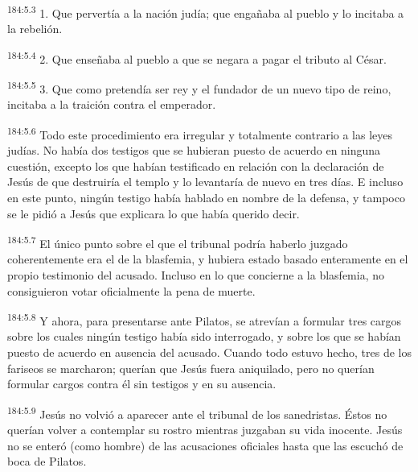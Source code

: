 \par 
\textsuperscript{184:5.3} 1. Que pervertía a la nación judía; que engañaba al pueblo y lo incitaba a la rebelión.

\par 
\textsuperscript{184:5.4} 2. Que enseñaba al pueblo a que se negara a pagar el tributo al César.

\par 
\textsuperscript{184:5.5} 3. Que como pretendía ser rey y el fundador de un nuevo tipo de reino, incitaba a la traición contra el emperador.

\par 
\textsuperscript{184:5.6} Todo este procedimiento era irregular y totalmente contrario a las leyes judías. No había dos testigos que se hubieran puesto de acuerdo en ninguna cuestión, excepto los que habían testificado en relación con la declaración de Jesús de que destruiría el templo y lo levantaría de nuevo en tres días. E incluso en este punto, ningún testigo había hablado en nombre de la defensa, y tampoco se le pidió a Jesús que explicara lo que había querido decir.

\par 
\textsuperscript{184:5.7} El único punto sobre el que el tribunal podría haberlo juzgado coherentemente era el de la blasfemia, y hubiera estado basado enteramente en el propio testimonio del acusado. Incluso en lo que concierne a la blasfemia, no consiguieron votar oficialmente la pena de muerte.

\par 
\textsuperscript{184:5.8} Y ahora, para presentarse ante Pilatos, se atrevían a formular tres cargos sobre los cuales ningún testigo había sido interrogado, y sobre los que se habían puesto de acuerdo en ausencia del acusado. Cuando todo estuvo hecho, tres de los fariseos se marcharon; querían que Jesús fuera aniquilado, pero no querían formular cargos contra él sin testigos y en su ausencia.

\par 
\textsuperscript{184:5.9} Jesús no volvió a aparecer ante el tribunal de los sanedristas. Éstos no querían volver a contemplar su rostro mientras juzgaban su vida inocente. Jesús no se enteró (como hombre) de las acusaciones oficiales hasta que las escuchó de boca de Pilatos.


